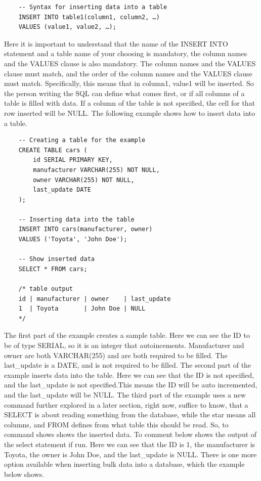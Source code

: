 \begin{verbatim}
    -- Syntax for inserting data into a table
    INSERT INTO table1(column1, column2, …)
    VALUES (value1, value2, …);
\end{verbatim}

Here it is important to understand that the name of the INSERT INTO statement and a table name of your choosing is mandatory, the column names and the VALUES clause is also mandatory. The column names and the VALUES clause must match, and the order of the column names and the VALUES clause must match. Specifically, this means that in column1, value1 will be inserted. So the person writing the SQL can define what comes first, or if all columns of a table is filled with data. If a column of the table is not specified, the cell for that row inserted will be NULL. The following example shows how to insert data into a table.

\begin{verbatim}
    -- Creating a table for the example
    CREATE TABLE cars (
        id SERIAL PRIMARY KEY,
        manufacturer VARCHAR(255) NOT NULL,
        owner VARCHAR(255) NOT NULL,
        last_update DATE
    );

    -- Inserting data into the table
    INSERT INTO cars(manufacturer, owner)
    VALUES ('Toyota', 'John Doe');

    -- Show inserted data
    SELECT * FROM cars;

    /* table output
    id | manufacturer | owner    | last_update
    1  | Toyota       | John Doe | NULL
    */
\end{verbatim}

The first part of the example creates a sample table. Here we can see the ID to be of type SERIAL, so it is an integer that autoincements. Manufacturer and owner are both VARCHAR(255) and are both required to be filled. The last\_update is a DATE, and is not required to be filled. The second part of the example inserts data into the table. Here we can see that the ID is not specified, and the last\_update is not specified.This means the ID will be auto incremented, and the last\_update will be NULL. The third part of the example uses a new command further explored in a later section, right now, suffice to know, that a SELECT is about reading something from the database, while the star means all columns, and FROM defines from what table this should be read. So, to command shows shows the inserted data. To comment below shows the output of the select statement if run. Here we can see that the ID is 1, the manufacturer is Toyota, the owner is John Doe, and the last\_update is NULL. There is one more option available when inserting bulk data into a database, which the example below shows.

